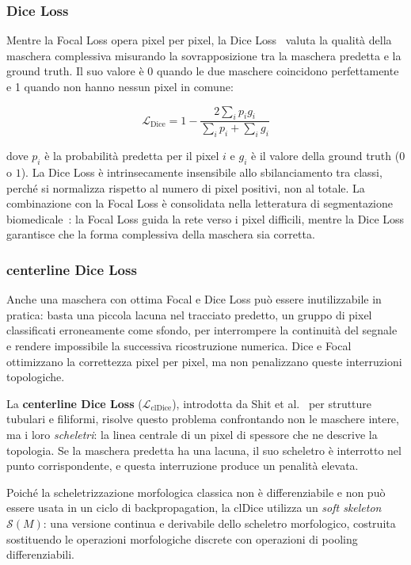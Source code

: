 \subsubsection{Dice Loss}

Mentre la Focal Loss opera pixel per pixel, la Dice Loss~\cite{sudre2017generalised} valuta la qualità della maschera complessiva misurando la sovrapposizione tra la maschera predetta e la ground truth. Il suo valore è 0 quando le due maschere coincidono perfettamente e 1 quando non hanno nessun pixel in comune:

\[
    \mathcal{L}_{\text{Dice}} = 1 - \frac{2 \sum_i p_i g_i}{\sum_i p_i + \sum_i g_i}
\]

dove $p_i$ è la probabilità predetta per il pixel $i$ e $g_i$ è il valore della ground truth ($0$ o $1$). La Dice Loss è intrinsecamente insensibile allo sbilanciamento tra classi, perché si normalizza rispetto al numero di pixel positivi, non al totale. La combinazione con la Focal Loss è consolidata nella letteratura di segmentazione biomedicale~\cite{isensee2021nnunet}: la Focal Loss guida la rete verso i pixel difficili, mentre la Dice Loss garantisce che la forma complessiva della maschera sia corretta.

\subsubsection{centerline Dice Loss}

Anche una maschera con ottima Focal e Dice Loss può essere inutilizzabile in pratica: basta una piccola lacuna nel tracciato predetto, un gruppo di pixel classificati erroneamente come sfondo, per interrompere la continuità del segnale e rendere impossibile la successiva ricostruzione numerica. Dice e Focal ottimizzano la correttezza pixel per pixel, ma non penalizzano queste interruzioni topologiche.

La \textbf{centerline Dice Loss} ($\mathcal{L}_{\text{clDice}}$), introdotta da Shit et al.~\cite{Shit_2021} per strutture tubulari e filiformi, risolve questo problema confrontando non le maschere intere, ma i loro \textit{scheletri}: la linea centrale di un pixel di spessore che ne descrive la topologia. Se la maschera predetta ha una lacuna, il suo scheletro è interrotto nel punto corrispondente, e questa interruzione produce un penalità elevata.

Poiché la scheletrizzazione morfologica classica non è differenziabile e non può essere usata in un ciclo di backpropagation, la clDice utilizza un \textit{soft skeleton} $\mathcal{S}(M)$: una versione continua e derivabile dello scheletro morfologico, costruita sostituendo le operazioni morfologiche discrete con operazioni di pooling differenziabili.

